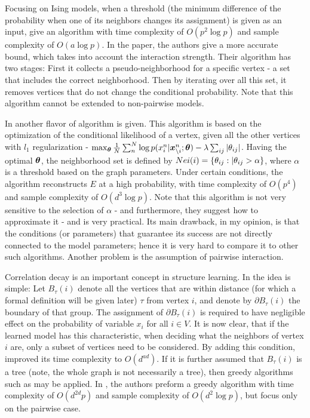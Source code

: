 Focusing on Ising models, when a threshold (the minimum difference of the probability when one of its neighbors changes its assignment) is given as an input, \cite{bresler2015efficiently} give an algorithm with time complexity of $O(p^2\log p)$ and sample complexity of $O( a \log p)$. In the paper, the authors give a more accurate bound, which takes into account the interaction strength. Their algorithm has two stages: First it collects a pseudo-neighborhood for a specific vertex - a set that includes the correct neighborhood. Then by iterating over all this set, it removes vertices that do not change the conditional probability. Note that this algorithm cannot be extended to non-pairwise models.

In \cite{ravikumar2010high} another flavor of algorithm is given. This algorithm is based on the optimization of the conditional likelihood of a vertex, given all the other vertices with $l_1$ regularization - $\max_{\boldsymbol{\theta}} \frac{1}{N}\sum_n^N \log p(x^n_i| \boldsymbol{x}^n_{\setminus i};\boldsymbol{\theta}) - \lambda \sum_{ij} |\theta_{ij}|$. Having the optimal $\boldsymbol{\theta}$, the neighborhood set is defined by $Nei(i) = \{\theta_{ij} : |\theta_{ij} > \alpha\}$, where $\alpha$ is a threshold based on the graph parameters. Under certain conditions, the algorithm reconstructs $E$ at a high probability, with time complexity of $O(p^4)$ and sample complexity of $O( d^3 \log p)$. Note that this algorithm is not very sensitive to the selection of $\alpha$ - and furthermore, they suggest how to approximate it - and is very practical. Its main drawback, in my opinion, is that the conditions (or parameters) that guarantee its success are not directly connected to the model parameters; hence it is very hard to compare it to other such algorithms. Another problem is the assumption of pairwise interaction.     

Correlation decay is an important concept in structure learning. In \cite{montanari2009graphical} the idea is simple: Let $B_{\tau}(i)$ denote all the vertices that are within distance (for which a formal definition will be given later) $\tau$ from vertex $i$, and denote by $\partial B_{\tau}(i)$ the boundary of that group. The assignment of $\partial B_{\tau}(i)$ is required to have negligible effect on the probability of variable $x_i$ for all $i \in V$. It is now clear, that if the learned model has this characteristic, when deciding what the neighbors of vertex $i$ are, only a subset of vertices need to be considered. By adding this condition, \cite{bresler2008reconstruction} improved its time complexity to $O(d^{ad})$. If it is further assumed that $B_{\tau}(i)$ is a tree (note, the whole graph is not necessarily a tree), then greedy algorithms such as \cite{netrapalli2010greedy, anandkumar2013learning} may be applied. In \cite{anandkumar2013learning}, the authors preform a greedy algorithm with time complexity of $O(d^{2d}p)$ and sample complexity of $O(d^2\log p)$, but focus only on the pairwise case.  

